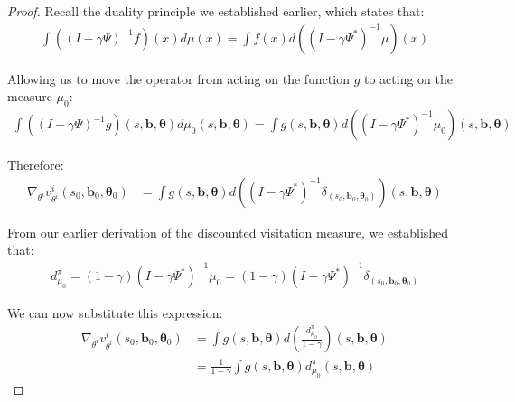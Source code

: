 \begin{proof}
    Recall the duality principle we established earlier, which states that:
    \begin{align}
        \int ((I - \gamma \Psi)^{-1}f)(x) d\mu(x) = \int f(x) d((I - \gamma \Psi^{*})^{-1}\mu)(x)
    \end{align}

    Allowing us to move the operator from acting on the function $g$ to acting on
    the measure $\mu_{0}$:
    \begin{align}
        \int ((I - \gamma \Psi)^{-1}g)(s, \boldsymbol{b}, \boldsymbol{\theta}) d\mu_{0}(s, \boldsymbol{b}, \boldsymbol{\theta}) = \int g(s, \boldsymbol{b}, \boldsymbol{\theta}) d((I - \gamma \Psi^{*})^{-1}\mu_{0})(s, \boldsymbol{b}, \boldsymbol{\theta})
    \end{align}

    Therefore:
    \begin{align}
        \nabla_{\theta^i}v^{i}_{\theta^i}(s_{0}, \boldsymbol{b}_{0}, \boldsymbol{\theta}_{0}) & = \int g(s, \boldsymbol{b}, \boldsymbol{\theta}) d((I - \gamma \Psi^{*})^{-1}\delta_{(s_0, \boldsymbol{b}_0, \boldsymbol{\theta}_0)})(s, \boldsymbol{b}, \boldsymbol{\theta})
    \end{align}

    From our earlier derivation of the discounted visitation measure, we established
    that:
    \begin{align}
        d^{\pi}_{\mu_0}= (1-\gamma)(I - \gamma \Psi^{*})^{-1}\mu_{0} = (1-\gamma)(I - \gamma \Psi^{*})^{-1}\delta_{(s_0, \boldsymbol{b}_0, \boldsymbol{\theta}_0)}
    \end{align}

    We can now substitute this expression:
    \begin{align}
        \nabla_{\theta^i}v^{i}_{\theta^i}(s_{0}, \boldsymbol{b}_{0}, \boldsymbol{\theta}_{0}) & = \int g(s, \boldsymbol{b}, \boldsymbol{\theta}) d\left(\frac{d^{\pi}_{\mu_0}}{1-\gamma}\right)(s, \boldsymbol{b}, \boldsymbol{\theta}) \\
                                                                                              & = \frac{1}{1-\gamma}\int g(s, \boldsymbol{b}, \boldsymbol{\theta}) d^{\pi}_{\mu_0}(s, \boldsymbol{b}, \boldsymbol{\theta})
    \end{align}


\end{proof}
